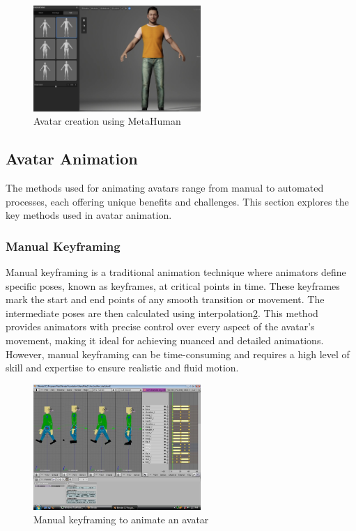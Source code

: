 \documentclass[../../main.tex]{subfiles}
\begin{document}
\begin{figure}
  \centering \includegraphics[width = 2.5in]{chapters/background_work/images/metahuman_example.png}
  \caption{Avatar creation using MetaHuman}
  \label{fig:metahuman_example}
\end{figure}

\subsection{Avatar Animation}

The methods used for animating avatars range from manual to automated processes, each offering unique benefits and challenges. This section explores the key methods used in avatar animation.

\subsubsection{Manual Keyframing}

Manual keyframing is a traditional animation technique where animators define specific poses, known as keyframes, at critical points in time. These keyframes mark the start and end points of any smooth transition or movement. The intermediate poses are then calculated using interpolation\ref{fig:keyframing}. This method provides animators with precise control over every aspect of the avatar’s movement, making it ideal for achieving nuanced and detailed animations. However, manual keyframing can be time-consuming and requires a high level of skill and expertise to ensure realistic and fluid motion.

\begin{figure}
  \centering \includegraphics[width = 2.5in]{chapters/background_work/images/keyframing.png}
  \caption{Manual keyframing to animate an avatar}
  \label{fig:keyframing}
\end{figure}
\end{document}
